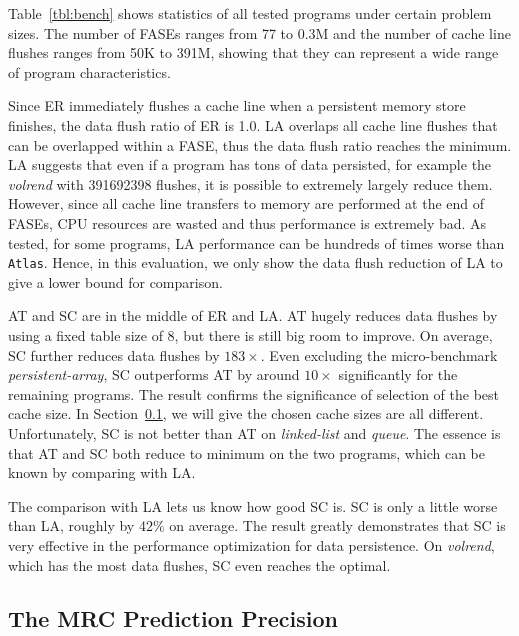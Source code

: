 \documentclass[preprint,nocopyrightspace,10pt]{sigplanconf}
\begin{document}
Table~\ref{tbl:bench} shows statistics of all tested programs under certain problem sizes.
The number of FASEs ranges from 77 to 0.3M and the number of cache line flushes 
ranges from 50K to 391M, showing that they can represent a wide range of program 
characteristics. 

Since ER immediately flushes a cache line when a persistent memory store 
finishes, the data flush ratio of ER is 1.0. LA  overlaps all cache line flushes that
can be overlapped within a FASE, thus the data flush ratio reaches the minimum.
LA suggests that even if a program has tons of data persisted, for example the \emph{volrend}
with 391692398 flushes, it is possible to extremely largely reduce them.
However, since all cache line transfers to memory are performed at the end of 
FASEs, CPU resources are wasted and thus performance is extremely bad. As tested,
for some programs, LA performance can be hundreds of times worse than \texttt{Atlas}.
Hence, in this evaluation, we only show the data flush reduction of LA  to
give a lower bound for comparison. 

AT and SC are in the middle of ER and LA. AT hugely reduces data flushes by
using a fixed table size of 8, but there is still big room to improve. On average,
SC further reduces data flushes by $183\times$. Even excluding the micro-benchmark
\emph{persistent-array}, SC outperforms AT by around $10\times$ significantly for 
the remaining programs. The result confirms the significance of selection of the best 
cache size. In Section~\ref{sec:mrc-res}, we will give
the chosen cache sizes are all different. Unfortunately, SC is not better than AT on 
\emph{linked-list} and \emph{queue}. The essence is that AT and SC both reduce to 
minimum on the two programs, which can be known by comparing with LA.

The comparison with LA lets us know how good SC is. SC is only a little worse than LA,
roughly by $42\%$ on average. The result greatly demonstrates that SC is very effective
in the performance optimization for data persistence. On \emph{volrend}, which has
the most data flushes, SC even reaches the optimal.

\subsection{The MRC Prediction Precision}
\label{sec:mrc-res}
\end{document}
